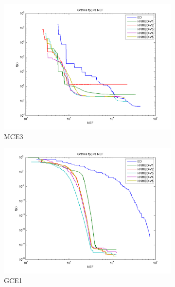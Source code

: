 \begin{figure}
\begin{subfigure}[b]{0.49\linewidth}
		\includegraphics[width=\linewidth]{Figures/C-Grafica_Convergencia_Problema_3}
		\caption{MCE3} \label{fig:M3} 
	\end{subfigure}
	\begin{subfigure}[b]{0.49\linewidth}
		\includegraphics[width=\linewidth]{Figures/C-Grafica_Convergencia_Problema_4}
		\caption{GCE1} \label{fig:G1} 
	\end{subfigure}
	\begin{subfigure}[b]{0.49\linewidth}

\end{subfigure}
\end{figure}
